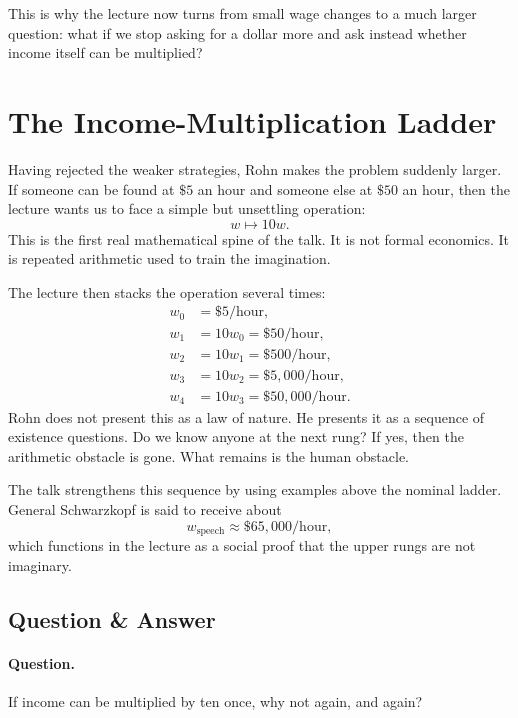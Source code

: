 This is why the lecture now turns from small wage changes to a much larger question: what if we stop asking for a dollar more and ask instead whether income itself can be multiplied?

\section{The Income-Multiplication Ladder}

Having rejected the weaker strategies, Rohn makes the problem suddenly larger. If someone can be found at \( \$5 \) an hour and someone else at \( \$50 \) an hour, then the lecture wants us to face a simple but unsettling operation:
\begin{equation}
w \mapsto 10w.
\end{equation}
This is the first real mathematical spine of the talk. It is not formal economics. It is repeated arithmetic used to train the imagination.

The lecture then stacks the operation several times:
\begin{align}
w_0 &= \$5/\text{hour}, \\
w_1 &= 10w_0 = \$50/\text{hour}, \\
w_2 &= 10w_1 = \$500/\text{hour}, \\
w_3 &= 10w_2 = \$5{,}000/\text{hour}, \\
w_4 &= 10w_3 = \$50{,}000/\text{hour}.
\end{align}
Rohn does not present this as a law of nature. He presents it as a sequence of existence questions. Do we know anyone at the next rung? If yes, then the arithmetic obstacle is gone. What remains is the human obstacle.

The talk strengthens this sequence by using examples above the nominal ladder. General Schwarzkopf is said to receive about
\begin{equation}
w_{\mathrm{speech}} \approx \$65{,}000/\text{hour},
\end{equation}
which functions in the lecture as a social proof that the upper rungs are not imaginary.

\subsection{Question \& Answer}

\paragraph{Question.} If income can be multiplied by ten once, why not again, and again?

